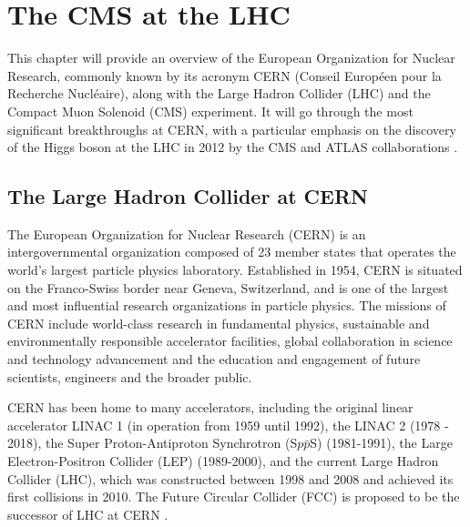\chapter[The CMS at the LHC]{The CMS at the LHC}

This chapter will provide an overview of the European Organization for Nuclear Research, commonly known by its acronym CERN (Conseil Européen pour la Recherche Nucléaire), along with the Large Hadron Collider (LHC) and the Compact Muon Solenoid (CMS) experiment. It will go through the most significant breakthroughs at CERN, with a particular emphasis on the discovery of the Higgs boson at the LHC in 2012 by the CMS and ATLAS collaborations \cite{CMS:2012qbp,ATLAS:2012yve}.

\section{The Large Hadron Collider at CERN}

The European Organization for Nuclear Research (CERN) is an intergovernmental organization composed of 23 member states that operates the world's largest particle physics laboratory. Established in 1954, CERN is situated on the Franco-Swiss border near Geneva, Switzerland, and is one of the largest and most influential research organizations in particle physics. The missions of CERN include world-class research in fundamental physics, sustainable and environmentally responsible accelerator facilities, global collaboration in science and technology advancement and the education and engagement of future scientists, engineers and the broader public.

CERN has been home to many accelerators, including the original linear accelerator \linebreak LINAC 1 (in operation from 1959 until 1992), the LINAC 2 (1978 - 2018), the Super Proton-Antiproton Synchrotron (S$p\bar{p}$S) (1981-1991), the Large Electron-Positron Collider (LEP) (1989-2000), and the current Large Hadron Collider (LHC), which was constructed between 1998 and 2008 and achieved its first collisions in 2010. The Future Circular Collider (FCC) is proposed to be the successor of LHC at CERN \cite{FCC:2018byv}.

